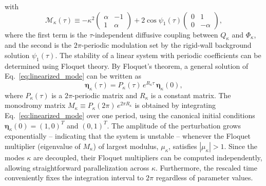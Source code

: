 \documentclass[prb,aps,twocolumn,superscriptaddress,floatfix]{revtex4-1}
\begin{document}
%
with
%
\begin{equation}
    \mathcal{M}_\kappa(\tau) \equiv -\kappa^2
    \begin{pmatrix}
    \alpha & -1 \\
    1 & \alpha
    \end{pmatrix}
    + 2\cos\psi_1(\tau)
    \begin{pmatrix}
    0 & 1 \\
    0 & -\alpha
    \end{pmatrix},
    \label{eq:stability_matrix_split}
\end{equation}
%
where the first term is the $\tau$-independent diffusive coupling between $Q_\kappa$ and $\Phi_\kappa$, and the second is the $2\pi$-periodic modulation set by the rigid-wall background solution $\psi_1(\tau)$. The stability of a linear system with periodic coefficients can be determined using Floquet theory. By Floquet's theorem, a general solution of Eq.~\eqref{eq:linearized_mode} can be written as
%
\begin{equation}
    \boldsymbol{\eta}_{\kappa}(\tau) = P_\kappa(\tau)\,e^{R_\kappa\tau}\,\boldsymbol{\eta}_\kappa(0),
\end{equation}
%
where $P_\kappa(\tau)$ is a $2\pi$-periodic matrix and $R_\kappa$ is a constant matrix. The monodromy matrix $M_\kappa \equiv P_\kappa(2\pi)\,e^{2\pi R_\kappa}$ is obtained by integrating Eq.~\eqref{eq:linearized_mode} over one period, using the canonical initial conditions $\boldsymbol{\eta}_\kappa(0) = (1,0)^T$ and $(0,1)^T$. The amplitude of the perturbation grows exponentially -- indicating that the system is unstable -- whenever the Floquet multiplier (eigenvalue of $M_\kappa$) of largest modulus, $\mu_\kappa$, satisfies $|\mu_\kappa|>1$. Since the modes $\kappa$ are decoupled, their Floquet multipliers can be computed independently, allowing straightforward parallelization across $\kappa$. Furthermore, the rescaled time conveniently fixes the integration interval to $2\pi$ regardless of parameter values.
\end{document}
